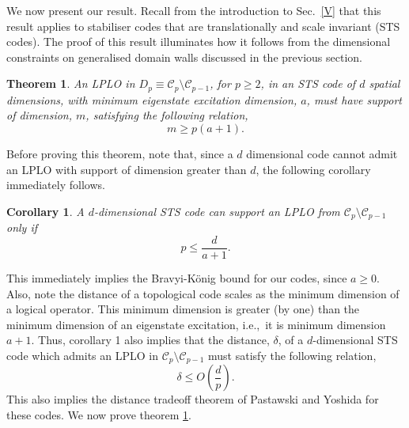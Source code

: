 \documentclass[pra,twocolumn,a4paper,nofootinbib]{revtex4-1}
\newtheorem{theorem}{Theorem}
\newtheorem{cor}{Corollary}
\begin{document}
We now present our result. Recall from the introduction to Sec.~\ref{V} that this result applies to stabiliser codes that are translationally and scale invariant (STS codes). The proof of this result illuminates how it follows from the dimensional constraints on generalised domain walls discussed in the previous section.
\begin{theorem}
\label{Th1}
An LPLO in $D_p \equiv \mathcal{C}_{p} \setminus \mathcal{C}_{p-1}$, for $p \geq 2$, in an STS code of $d$ spatial dimensions, with minimum eigenstate excitation dimension, $a$, must have support of dimension, $m$, satisfying the following relation,
\begin{equation}
m \geq p(a+1).
\end{equation} 
\end{theorem}
Before proving this theorem, note that, since a $d$ dimensional code cannot admit an LPLO with support of dimension greater than $d$, the following corollary immediately follows.
\begin{cor}
\label{cor1}
A $d$-dimensional STS code can support an LPLO from $\mathcal{C}_{p} \setminus \mathcal{C}_{p-1}$ only if
\begin{equation}
p \leq \frac{d}{a+1}.
\end{equation}
\end{cor}
This immediately implies the Bravyi-K{\"o}nig bound for our codes, since $a \geq 0$. Also, note the distance of a topological code scales as the minimum dimension of a logical operator.  This minimum dimension is greater (by one) than the minimum dimension of an eigenstate excitation, i.e.,~it is minimum dimension $a+1$. Thus, corollary 1 also implies that the distance, $\delta$, of a $d$-dimensional STS code which admits an LPLO in $\mathcal{C}_p\setminus \mathcal{C}_{p-1}$ must satisfy the following relation,
\begin{equation}
\delta \leq O\left(\frac{d}{p}\right).
\end{equation}
This also implies the distance tradeoff theorem of Pastawski and Yoshida \cite{PY} for these codes.
We now prove theorem \ref{Th1}.
\end{document}

